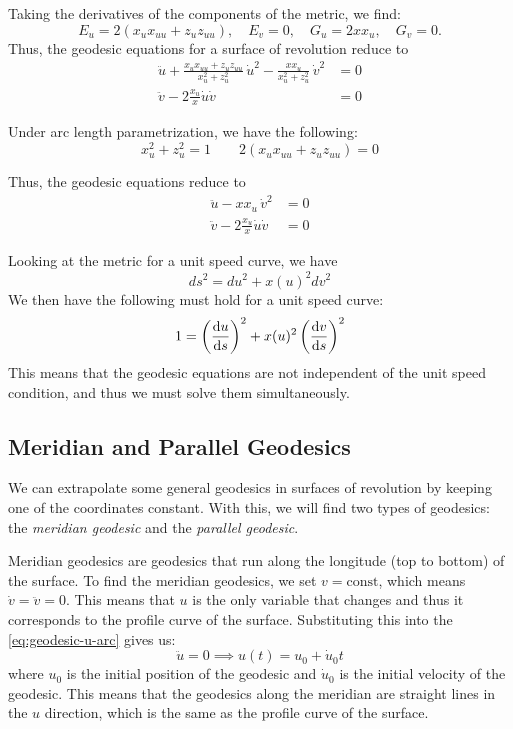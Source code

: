 \documentclass[12pt]{article}
\begin{document}
Taking the derivatives of the components of the metric, we find:	
\[
E_{u} = 2(x_{u}x_{uu} + z_{u}z_{uu}), \quad E_{v} = 0, \quad G_{u} = 2xx_{u}, \quad G_{v} = 0.
\]
Thus, the geodesic equations for a surface of revolution reduce to
\begin{align}
	\ddot{u} + \frac{x_{u}x_{uu} + z_{u}z_{uu}}{x_{u}^{2} + z_{u}^{2}}\,\dot{u}^2 - \frac{x x_{u}}{x_{u}^{2} + z_{u}^{2}}\,\dot{v}^{2} &= 0 \label{eq:geodesic-u}\\
	\ddot{v} - 2\frac{x_{u}}{x}\dot{u}\dot{v} &= 0 \label{eq:geodesic-v}
\end{align}

Under arc length parametrization, we have the following:
\[
	x_{u}^{2} + z_{u}^{2} = 1 \qquad 2(x_{u}x_{uu} + z_{u}z_{uu}) = 0 
\]

Thus, the geodesic equations reduce to
\begin{align}
	\ddot{u} - x x_{u}\,\dot{v}^{2} &= 0 \label{eq:geodesic-u-arc}\\
	\ddot{v} - 2\frac{x_{u}}{x}\dot{u}\dot{v} &= 0 \label{eq:geodesic-v-arc}
\end{align}

Looking at the metric for a unit speed curve, we have
\[
	ds^{2} = du^{2} + x(u)^{2}dv^{2} 
\]
We then have the following must hold for a unit speed curve:
\begin{equation}\label{eq:unit-speed-condition}
	1 = \left(\dv{u}{s}\right)^{2} + x(u)^{2}\left(\dv{v}{s}\right)^{2} 
\end{equation}
This means that the geodesic equations are not independent of the unit speed condition, and thus we must solve them simultaneously.

\subsection{Meridian and Parallel Geodesics}
We can extrapolate some general geodesics in surfaces of revolution by keeping one of the coordinates constant.
With this, we will find two types of geodesics: the \emph{meridian geodesic} and the \emph{parallel geodesic}.

Meridian geodesics are geodesics that run along the longitude (top to bottom) of the surface.
To find the meridian geodesics, we set $v = \text{const}$, which means $\dot{v} = \ddot{v} = 0$.
This means that $u$ is the only variable that changes and thus it corresponds to the profile curve of the surface.
Substituting this into the \eqref{eq:geodesic-u-arc} gives us:
\[
	\ddot{u} = 0 \implies u(t) = u_0 + \dot{u}_0 t
\]
where \(u_0\) is the initial position of the geodesic and \(\dot{u}_0\) is the initial velocity of the geodesic.
This means that the geodesics along the meridian are straight lines in the \(u\) direction, which is the same as the profile curve of the surface.
\end{document}
